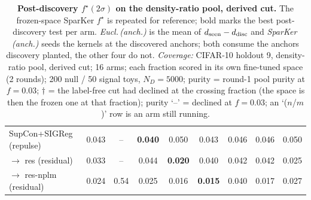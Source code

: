 \begin{table}[t]
\begin{tabular}{lcccccccc}
\addlinespace
SupCon+SIGReg (repulse) & 0.043 & -- & \textbf{0.040} & 0.050 & 0.043 & 0.046 & 0.046 & 0.050 \\
\quad $\to$ res (residual) & 0.033 & -- & 0.044 & \textbf{0.020} & 0.040 & 0.042 & 0.042 & 0.025 \\
\quad $\to$ res-nplm (residual) & 0.024 & 0.54 & 0.025 & 0.016 & \textbf{0.015} & 0.040 & 0.017 & 0.027 \\
\bottomrule
\end{tabular}
\caption{\textbf{Post-discovery $f^\star(2\sigma)$ on the density-ratio pool, derived cut.} The frozen-space SparKer $f^\star$ is repeated for reference; bold marks the best post-discovery test per arm. \emph{Eucl.\,(anch.)} is the mean of $d_{\rm seen}-d_{\rm disc}$ and \emph{SparKer\,(anch.)} seeds the kernels at the discovered anchors; both consume the anchors discovery planted, the other four do not. \emph{Coverage:} CIFAR-10 holdout 9, density-ratio pool, derived cut; 16 arms; each fraction scored in its own fine-tuned space (2 rounds); 200 null / 50 signal toys, $N_D{=}5000$; purity = round-1 pool purity at $f{=}0.03$; $\dagger$ = the label-free cut had declined at the crossing fraction (the space is then the frozen one at that fraction); purity `--' = declined at $f{=}0.03$; an `($n$/$m$)' row is an arm still running.}
\label{tab:sigma_post_cifar10_h9_np-legal}
\end{table}
